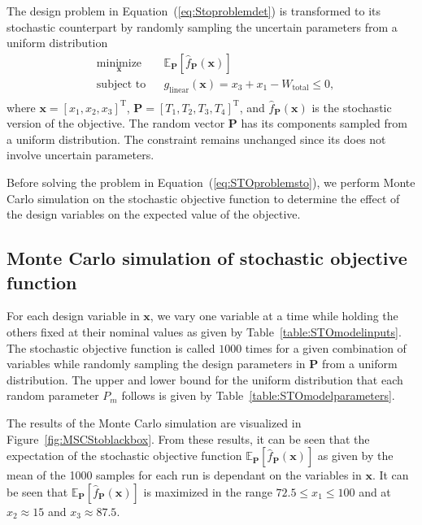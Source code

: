 The design problem in Equation~(\ref{eq:Stoproblemdet}) is transformed to its stochastic counterpart by randomly sampling the uncertain parameters from a uniform distribution
%
\begin{equation}
	\begin{aligned}
		& \underset{\mathbf{x}}{\text{minimize}}
		& & \mathbb{E}_{\mathbf{P}}\left[\hat{f}_{\mathbf{P}}(\mathbf{x})\right]\\
		& \text{subject to}
		& & {g_{\textrm{linear}}}(\mathbf{x}) = x_3 + x_1 - W_{\textrm{total}} \le 0,\\
	\end{aligned}
	\label{eq:STOproblemsto}
\end{equation}
%
where $\mathbf{x} = \left[x_1,x_2,x_3\right]^{\textrm{T}}$, $\mathbf{P} = \left[T_1,T_2,T_3,T_4\right]^{\textrm{T}}$, and $\hat{f}_{\mathbf{P}}(\mathbf{x})$ is the stochastic version of the objective. The random vector $\mathbf{P}$ has its components sampled from a uniform distribution. The constraint remains unchanged since its does not involve uncertain parameters.

Before solving the problem in Equation~(\ref{eq:STOproblemsto}), we perform Monte Carlo simulation on the stochastic objective function to determine the effect of the design variables on the expected value of the objective.

\subsection{Monte Carlo simulation of stochastic objective function} \label{subsec:MCSsto}


For each design variable in $\mathbf{x}$, we vary one variable at a time while holding the others fixed at their nominal values as given by Table~\ref{table:STOmodelinputs}. The stochastic objective function is called $1000$ times for a given combination of variables while randomly sampling the design parameters in $\mathbf{P}$ from a uniform distribution. The upper and lower bound for the uniform distribution that each random parameter $P_m$ follows is given by Table~\ref{table:STOmodelparameters}.

The results of the Monte Carlo simulation are visualized in Figure~\ref{fig:MSCStoblackbox}. From these results, it can be seen that the expectation of the stochastic objective function $\mathbb{E}_{\mathbf{P}}\left[\hat{f}_{\mathbf{P}}(\mathbf{x})\right]$ as given by the mean of the 1000 samples for each run is dependant on the variables in $\mathbf{x}$. It can be seen that $\mathbb{E}_{\mathbf{P}}\left[\hat{f}_{\mathbf{P}}(\mathbf{x})\right]$ is maximized in the range $ 72.5 \le x_1 \le 100 $ and at $x_2 \approx 15$ and $x_3 \approx 87.5$.

